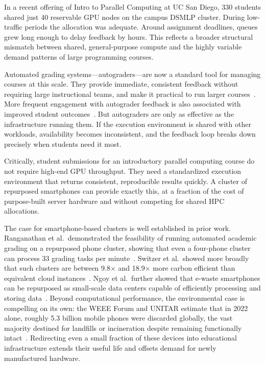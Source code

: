 \documentclass[acmlarge]{acmart}
\begin{document}
In a recent offering of Intro to Parallel Computing at UC San Diego,
330 students shared just 40 reservable GPU nodes on the campus DSMLP
cluster. During low-traffic periods the allocation was adequate.
Around assignment deadlines, queues grew long enough to delay feedback
by hours. This reflects a broader structural mismatch between
shared, general-purpose compute and the highly variable demand
patterns of large programming courses.

Automated grading systems---autograders---are now a standard tool for
managing courses at this scale. They provide immediate, consistent
feedback without requiring large instructional teams, and make it
practical to run larger courses~\cite{keuning2018}. More frequent
engagement with autograder feedback is also associated with improved
student outcomes~\cite{tran2025}. But autograders are only as
effective as the infrastructure running them. If the execution
environment is shared with other workloads, availability becomes inconsistent, and the feedback loop breaks down precisely when students need it most.

Critically, student submissions for an introductory parallel computing
course do not require high-end GPU throughput. They need a standardized
execution environment that returns consistent, reproducible results
quickly. A cluster of repurposed smartphones can provide exactly this,
at a fraction of the cost of purpose-built server hardware and without
competing for shared HPC allocations.

The case for smartphone-based clusters is well established in prior work. Ranganathan et al.\ demonstrated the feasibility of running automated academic grading on a repurposed phone cluster, showing that even a four-phone cluster can process 33 grading tasks per minute~\cite{ranganathan2025junkyard}. Switzer et al.\ showed more broadly that such clusters are between 9.8$\times$ and 18.9$\times$ more carbon efficient than equivalent cloud instances~\cite{10.1145/3575693.3575710}. Ngoy et al.\ further showed that e-waste smartphones can be repurposed as small-scale data centers capable of efficiently processing and storing data~\cite{ngoy2025ewaste}. Beyond computational performance, the environmental case is compelling on its own: the WEEE Forum and UNITAR estimate that in 2022 alone, roughly 5.3 billion mobile phones were discarded globally, the vast majority destined for landfills or incineration despite remaining functionally intact~\cite{weeeforum2022}. Redirecting even a small fraction of these devices into educational infrastructure extends their useful life and offsets demand for newly manufactured hardware.
\end{document}
